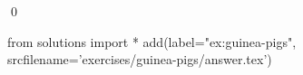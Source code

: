 \begin{ex}
  \label{ex:guinea-pigs}
  
  \qed
\end{ex}
\begin{python0}
from solutions import *
add(label="ex:guinea-pigs",
    srcfilename='exercises/guinea-pigs/answer.tex') 
\end{python0}                              
